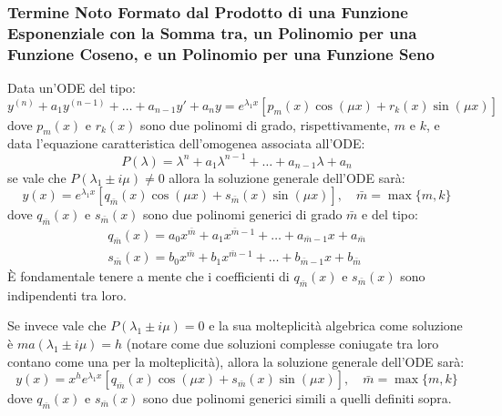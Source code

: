 \documentclass[a4paper,11pt]{article}
\begin{document}
\subsubsection[\texorpdfstring{$f(x)$ da Esponenziale, Polinomio e Trig.}{f(x) da Esponenziale, Polinomio e Trig.}]{Termine Noto Formato dal Prodotto di una Funzione Esponenziale con la Somma tra, un Polinomio per una Funzione Coseno, e un Polinomio per una Funzione Seno}
Data un'ODE del tipo:
\begin{equation*}
    y^{(n)} + a_1y^{(n-1)} + \ldots + a_{n-1}y' + a_ny = e^{\lambda_1 x}[p_m(x)\cos(\mu x) + r_k(x)\sin(\mu x)]
\end{equation*}
dove $p_m(x)$ e $r_k(x)$ sono due polinomi di grado, rispettivamente, $m$ e $k$, e data l'equazione caratteristica dell'omogenea associata all'ODE:
\begin{equation*}
    P(\lambda) = \lambda^n + a_1\lambda^{n-1} + \ldots + a_{n-1}\lambda + a_n
\end{equation*}
se vale che $P(\lambda_1 \pm i\mu) \neq 0$ allora la soluzione generale dell'ODE sarà:
\begin{equation*}
    y(x) = e^{\lambda_1 x}[q_{\bar{m}}(x)\cos(\mu x) + s_{\bar{m}}(x)\sin(\mu x)], \quad \bar{m} = \max\{m,k\}
\end{equation*}
dove $q_{\bar{m}}(x)$ e $s_{\bar{m}}(x)$ sono due polinomi generici di grado $\bar{m}$ e del tipo:
\begin{equation*}
    \begin{array}{l}
    q_{\bar{m}}(x) = a_0x^{\bar{m}} + a_1x^{\bar{m}-1} + \ldots + a_{\bar{m}-1}x+a_{\bar{m}} \\
    s_{\bar{m}}(x) = b_0x^{\bar{m}} + b_1x^{\bar{m}-1} + \ldots + b_{\bar{m}-1}x+b_{\bar{m}}
    \end{array}
\end{equation*}
È fondamentale tenere a mente che i coefficienti di $q_{\bar{m}}(x)$ e $s_{\bar{m}}(x)$ sono indipendenti tra loro.

Se invece vale che $P(\lambda_1\pm i\mu) = 0$ e la sua molteplicità algebrica come soluzione è $ma(\lambda_1\pm i\mu) = h$ (notare come due soluzioni complesse coniugate tra loro contano come una per la molteplicità), allora la soluzione generale dell'ODE sarà:
\begin{equation*}
    y(x) = x^he^{\lambda_1 x}[q_{\bar{m}}(x)\cos(\mu x) + s_{\bar{m}}(x)\sin(\mu x)], \quad \bar{m} = \max\{m,k\}
\end{equation*}
dove $q_{\bar{m}}(x)$ e $s_{\bar{m}}(x)$ sono due polinomi generici simili a quelli definiti sopra.
\end{document}
